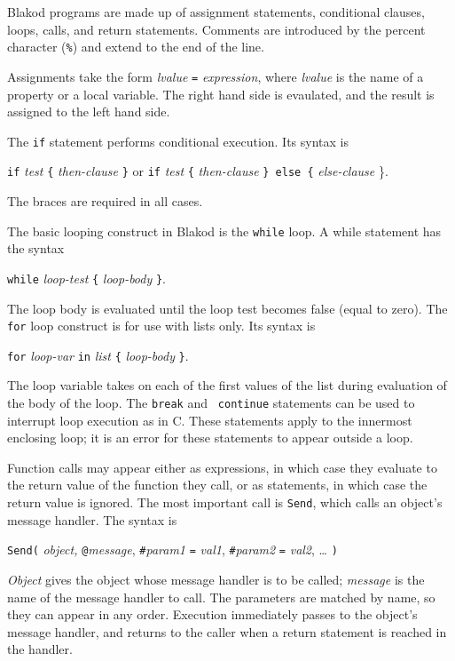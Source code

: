 \documentclass[12pt]{article}
\begin{document}
Blakod programs are made up of assignment statements, conditional
clauses, loops, calls, and return statements.  Comments are introduced
by the percent character ({\tt \%}) and extend to the end of the
line.

Assignments take the form {\em lvalue} {\tt =} {\em expression}, where
{\em lvalue} is the name of a property or a local variable.  The right
hand side is evaulated, and the result is assigned to the left hand
side.

The {\tt if} statement performs conditional execution.  Its syntax is
\begin{center}
{\tt if} {\em test} {\tt \{} {\em then-clause} {\tt \}} or
\linebreak
{\tt if} {\em test} {\tt \{} {\em then-clause} {\tt \} else \{} {\em
else-clause} {\}}.
\end{center}
The braces are required in all cases.

The basic looping construct in Blakod is the {\tt while} loop.  A while
statement has the syntax 
\begin{center}
{\tt while} {\em loop-test} {\tt \{} {\em loop-body} {\tt \}}.
\end{center}
The loop body is evaluated until the loop test becomes false (equal to
zero).  The {\tt for} loop construct is for use with lists only.  Its
syntax is
\begin{center}
{\tt for} {\em loop-var} {\tt in} {\em list} {\tt \{} {\em loop-body} {\tt \}}.
\end{center}
The loop variable takes on each of the first values of the list during
evaluation of the body of the loop.  The {\tt break} and {\tt
continue} statements can be used to interrupt loop execution as in C.
These statements apply to the innermost enclosing loop; it is an error
for these statements to appear outside a loop.

Function calls may appear either as expressions, in which case they evaluate
to the return value of the function they call, or as statements, in
which case the return value is ignored.  The most important call is
{\tt Send}, which calls an object's message handler.  The syntax is
\begin{center}
{\tt Send(} {\em object, } {\tt @}{\em message}, {\tt \#}{\em param1}
{\tt =} {\em val1}, {\tt \#}{\em param2} {\tt =} {\em val2}, \ldots
{\tt )}
\end{center}
{\em Object} gives the object whose message handler is to be called;
{\em message} is the name of the message handler to call.  The
parameters are matched by name, so they can appear in any order.
Execution immediately passes to the object's message handler, and
returns to the caller when a return statement is reached in the
handler.  
\end{document}
